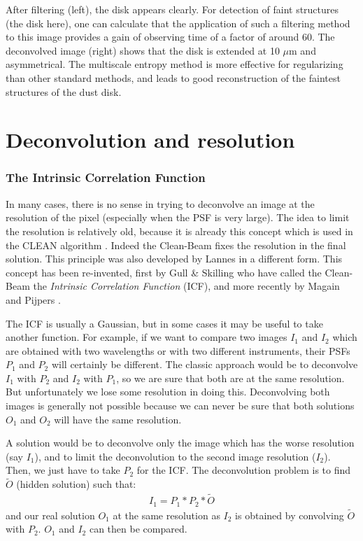 \documentclass[11pt,a4paper]{article}
\begin{document}
After filtering (left), the disk appears
clearly. For detection of faint structures (the disk here), 
one can calculate that the application of such a filtering method
to this image provides a gain of observing time of a factor 
of around 60. The deconvolved image (right) shows that the disk is extended
 at 10 $\mu$m and asymmetrical. The multiscale entropy method is
  more effective for regularizing than  other standard methods, 
and leads to good reconstruction of the faintest structures 
of the dust disk.


\section{Deconvolution and resolution}
\subsubsection*{The Intrinsic Correlation Function}
In many cases, there is no sense in trying to deconvolve an image at the 
resolution
of the pixel (especially when the PSF is very large). The idea to limit 
the 
resolution is relatively old, because it is already this concept which 
is used in the CLEAN algorithm \cite{rest:hogbom74}. Indeed the 
Clean-Beam
fixes the resolution in the final solution. This principle was also 
developed by Lannes \cite*{rest:lannes87} in a different form. 
This concept has been re-invented,  first by
Gull \& Skilling \cite*{entropy:gull91} who have called the Clean-Beam 
the {\em Intrinsic Correlation Function} (ICF), and more recently by
Magain \cite*{rest:magain98} and Pijpers \cite*{rest:Pijpers:99}. 

The ICF is usually a Gaussian, but in some cases it may be useful to
take another function. For example, if we want to compare two images 
$I_1$ and
$I_2$ which are obtained with 
two wavelengths or with two different instruments,
their PSFs $P_1$ and $P_2$ will certainly be different. The classic approach 
would
be to deconvolve $I_1$ with $P_2$ and $I_2$ with $P_1$, so we are sure that
both are at the same resolution. But unfortunately we lose some 
resolution in doing this.
Deconvolving both images is generally not possible because we can never 
be sure
that both solutions $O_1$ and $O_2$ will have the same resolution. 

A solution would be to 
deconvolve only the image which has the worse resolution
(say $I_1$), and to limit the deconvolution to the second image 
resolution ($I_2$).
Then, we just have to take $P_2$ for the ICF. The deconvolution problem 
is to
find $\tilde O$ (hidden solution) such that:
\begin{eqnarray}
I_1 = P_1 * P_2 * \tilde O
\end{eqnarray}
and our real solution $O_1$ at the same resolution as $I_2$ is 
obtained
by convolving $\tilde O$ with $P_2$. $O_1$ and $I_2$ can then be 
compared.
\end{document}
